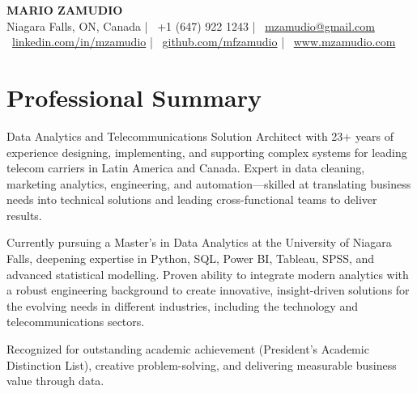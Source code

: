 \documentclass[a4paper,10pt]{article}
\begin{document}
\begin{center}
    {\LARGE \textbf{MARIO ZAMUDIO}}\\
    Niagara Falls, ON, Canada \quad | \quad \faPhone*~+1 (647) 922 1243 \quad | \quad \faEnvelope~\href{mailto:mzamudio@gmail.com}{mzamudio@gmail.com} \\
    \faLinkedin~\href{https://linkedin.com/in/mzamudio}{linkedin.com/in/mzamudio} \quad | \quad
    \faGithub~\href{https://github.com/mfzamudio}{github.com/mfzamudio} \quad | \quad
    \faGlobe~\href{https://www.mzamudio.com}{www.mzamudio.com}
\end{center}

\vspace{1em}

\section*{\textcolor{myblue}{Professional Summary}}

Data Analytics and Telecommunications Solution Architect with 23+ years of experience designing, implementing, and supporting complex systems for leading telecom carriers in Latin America and Canada. Expert in data cleaning, marketing analytics, engineering, and automation—skilled at translating business needs into technical solutions and leading cross-functional teams to deliver results.

Currently pursuing a Master’s in Data Analytics at the University of Niagara Falls, deepening expertise in Python, SQL, Power BI, Tableau, SPSS, and advanced statistical modelling. Proven ability to integrate modern analytics with a robust engineering background to create innovative, insight-driven solutions for the evolving needs in different industries, including the technology and telecommunications sectors.

Recognized for outstanding academic achievement (President’s Academic Distinction List), creative problem-solving, and delivering measurable business value through data.
\end{document}
